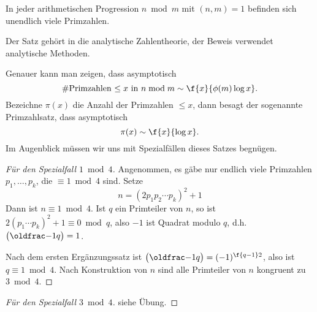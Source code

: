 \begin{st}[Dirichlet] \label{2.17}
	In jeder arithmetischen Progression $n \bmod m$ mit $(n,m) = 1$ befinden sich unendlich viele Primzahlen.
	\begin{note}
		Der Satz gehört in die analytische Zahlentheorie, der Beweis verwendet analytische Methoden.

		Genauer kann man zeigen, dass asymptotisch
		\[
			\# \text{Primzahlen $\le x$ in $n \bmod m$}
			\sim
			\f {x}{\phi(m) \log x}.
		\]
		Bezeichne $\pi(x)$ die Anzahl der Primzahlen $\le x$, dann besagt der sogenannte Primzahlsatz, dass asymptotisch
		\[
			\pi(x) \sim \f{x}{\log x}.
		\]
		Im Augenblick müssen wir uns mit Spezialfällen dieses Satzes begnügen.
	\end{note}
	\begin{proof}[Für den Spezialfall $1 \bmod 4$]
		Angenommen, es gäbe nur endlich viele Primzahlen $p_1, \dotsc, p_k$, die $\equiv 1 \bmod 4$ sind.
		Setze
		\[
			n = (2 p_1 p_2 \dotsb p_k)^2 + 1
		\]
		Dann ist $n \equiv 1 \bmod 4$.
		Ist $q$ ein Primteiler von $n$, so ist $2(p_1\dotsb p_k)^2 + 1 \equiv 0 \bmod q$, also $-1$ ist Quadrat modulo $q$, d.h. $\legsym{-1}{q} = 1$.

		Nach dem ersten Ergänzungssatz ist $\legsym{-1}{q} = (-1)^{\f{q-1}2}$, also ist $q \equiv 1 \bmod 4$.
		Nach Konstruktion von $n$ sind alle Primteiler von $n$ kongruent zu $3 \bmod 4$.
	\end{proof}
	\begin{proof}[Für den Spezialfall $3 \bmod 4$]
		siehe Übung.
	\end{proof}
\end{st}




